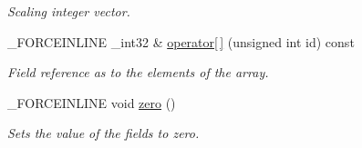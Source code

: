 \begin{DoxyCompactItemize}
\begin{DoxyCompactList}\small\item\em Scaling integer vector. \end{DoxyCompactList}\item 
\hypertarget{classbt_1_1vector4i_accc33c1c025072bd24d3cf59c2d0ef28}{\-\_\-\-F\-O\-R\-C\-E\-I\-N\-L\-I\-N\-E \-\_\-int32 \& \hyperlink{classbt_1_1vector4i_accc33c1c025072bd24d3cf59c2d0ef28}{operator\mbox{[}$\,$\mbox{]}} (unsigned int id) const }\label{classbt_1_1vector4i_accc33c1c025072bd24d3cf59c2d0ef28}

\begin{DoxyCompactList}\small\item\em Field reference as to the elements of the array. \end{DoxyCompactList}\item 
\hypertarget{classbt_1_1vector4i_aa73e694e66c679ba678351c187585d1e}{\-\_\-\-F\-O\-R\-C\-E\-I\-N\-L\-I\-N\-E void \hyperlink{classbt_1_1vector4i_aa73e694e66c679ba678351c187585d1e}{zero} ()}\label{classbt_1_1vector4i_aa73e694e66c679ba678351c187585d1e}

\begin{DoxyCompactList}\small\item\em Sets the value of the fields to zero. \end{DoxyCompactList}\end{DoxyCompactItemize}
